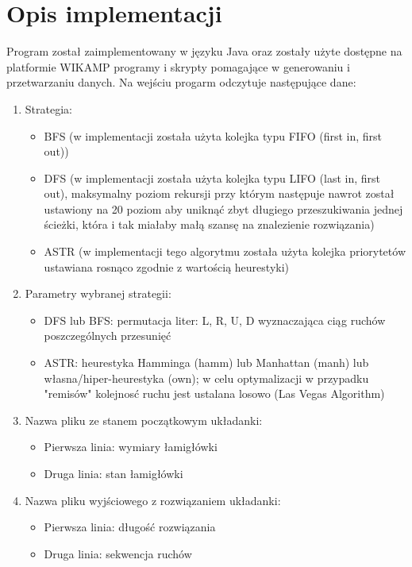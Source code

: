 \documentclass{classrep}
\begin{document}
\section{Opis implementacji}
Program został zaimplementowany w języku Java oraz zostały użyte dostępne na platformie WIKAMP programy i skrypty
pomagające w generowaniu i przetwarzaniu danych. Na wejściu progarm odczytuje następujące dane:
\begin{enumerate}
	\item Strategia:
	\begin{itemize}
		\item BFS (w implementacji została użyta kolejka typu FIFO (first in, first out))
		\item DFS (w implementacji została użyta kolejka typu LIFO (last in, first out), maksymalny poziom rekursji przy którym następuje nawrot został ustawiony na 20 poziom aby uniknąć zbyt długiego przeszukiwania jednej ścieżki, która i tak miałaby małą szansę na znalezienie rozwiązania)
		\item ASTR  (w implementacji tego algorytmu została użyta kolejka priorytetów ustawiana rosnąco zgodnie z wartością heurestyki)
	\end{itemize}
	
	\item Parametry wybranej strategii:
	\begin{itemize}
		\item DFS lub BFS: permutacja liter: L, R, U, D wyznaczająca ciąg ruchów poszczególnych przesunięć
		\item ASTR: heurestyka Hamminga (hamm) lub Manhattan (manh) lub własna/hiper-heurestyka (own); w celu optymalizacji w przypadku "remisów" kolejnosć ruchu jest ustalana losowo  (Las Vegas Algorithm)
	\end{itemize}
	
	\item Nazwa pliku ze stanem początkowym układanki:
	\begin{itemize}
		\item Pierwsza linia: wymiary łamigłówki
		\item Druga linia: stan łamigłówki
	\end{itemize}
	
	\item Nazwa pliku wyjściowego z rozwiązaniem układanki:
	\begin{itemize}
		\item Pierwsza linia: długość rozwiązania
		\item Druga linia: sekwencja ruchów
	\end{itemize}
	

\end{enumerate}
\end{document}
